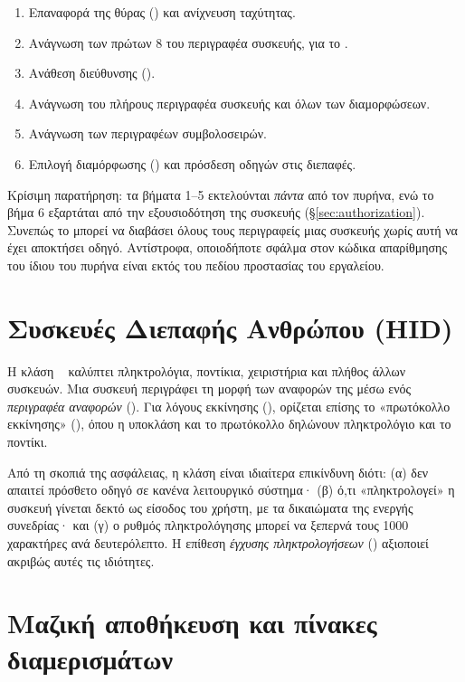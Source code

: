 \begin{enumerate}
  \item Επαναφορά της θύρας () και ανίχνευση ταχύτητας.
  \item Ανάγνωση των πρώτων 8  του περιγραφέα συσκευής, για το
        .
  \item Ανάθεση διεύθυνσης ().
  \item Ανάγνωση του πλήρους περιγραφέα συσκευής και όλων των διαμορφώσεων.
  \item Ανάγνωση των περιγραφέων συμβολοσειρών.
  \item Επιλογή διαμόρφωσης () και πρόσδεση οδηγών
        στις διεπαφές.
\end{enumerate}

Κρίσιμη παρατήρηση: τα βήματα 1–5 εκτελούνται \emph{πάντα} από τον πυρήνα, ενώ
το βήμα 6 εξαρτάται από την εξουσιοδότηση της συσκευής (§\ref{sec:authorization}).
Συνεπώς το \Probolos{} μπορεί να διαβάσει όλους τους περιγραφείς μιας συσκευής
χωρίς αυτή να έχει αποκτήσει οδηγό. Αντίστροφα, οποιοδήποτε σφάλμα στον κώδικα
απαρίθμησης του ίδιου του πυρήνα είναι εκτός του πεδίου προστασίας του εργαλείου.

\section{Συσκευές Διεπαφής Ανθρώπου (HID)}
\label{sec:hid}

Η κλάση ~\cite{usbhid111} καλύπτει πληκτρολόγια, ποντίκια, χειριστήρια
και πλήθος άλλων συσκευών. Μια συσκευή  περιγράφει τη μορφή των
αναφορών της μέσω ενός \emph{περιγραφέα αναφορών} (). Για
λόγους εκκίνησης (), ορίζεται επίσης το «πρωτόκολλο εκκίνησης»
(), όπου η υποκλάση  και το πρωτόκολλο 
δηλώνουν πληκτρολόγιο και το  ποντίκι.

Από τη σκοπιά της ασφάλειας, η κλάση  είναι ιδιαίτερα επικίνδυνη διότι:
(α) δεν απαιτεί πρόσθετο οδηγό σε κανένα λειτουργικό σύστημα· (β) ό,τι
«πληκτρολογεί» η συσκευή γίνεται δεκτό ως είσοδος του χρήστη, με τα δικαιώματα
της ενεργής συνεδρίας· και (γ) ο ρυθμός πληκτρολόγησης μπορεί να ξεπερνά τους
1000 χαρακτήρες ανά δευτερόλεπτο. Η επίθεση \emph{έγχυσης πληκτρολογήσεων}
() αξιοποιεί ακριβώς αυτές τις ιδιότητες.

\section{Μαζική αποθήκευση και πίνακες διαμερισμάτων}
\label{sec:msc}

